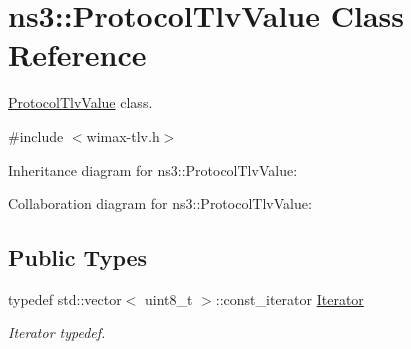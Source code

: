 \hypertarget{classns3_1_1ProtocolTlvValue}{}\section{ns3\+:\+:Protocol\+Tlv\+Value Class Reference}
\label{classns3_1_1ProtocolTlvValue}


\hyperlink{classns3_1_1ProtocolTlvValue}{Protocol\+Tlv\+Value} class.  




{\ttfamily \#include $<$wimax-\/tlv.\+h$>$}



Inheritance diagram for ns3\+:\+:Protocol\+Tlv\+Value\+:


Collaboration diagram for ns3\+:\+:Protocol\+Tlv\+Value\+:
\subsection*{Public Types}
\begin{DoxyCompactItemize}
\item 
typedef std\+::vector$<$ uint8\+\_\+t $>$\+::const\+\_\+iterator \hyperlink{classns3_1_1ProtocolTlvValue_a83a87352f3acebc8d47c963d4f1936f0}{Iterator}
\begin{DoxyCompactList}\small\item\em Iterator typedef. \end{DoxyCompactList}\end{DoxyCompactItemize}
